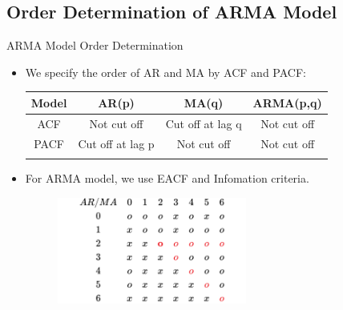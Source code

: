 \documentclass{beamer}
\begin{document}
\subsection{Order Determination of ARMA Model}
\begin{frame}{ARMA Model Order Determination}
  \begin{itemize}
    \item We specify the order of AR and MA by ACF and PACF:
      \begin{tabular}{c c c c}
        \\ %
          \toprule[2pt]
          Model & AR(p) & MA(q) & ARMA(p,q)  \\ \midrule[1pt]
          ACF   & Not cut off   & Cut off at lag q &  Not cut off\\
          PACF & Cut off at lag p & Not cut off & Not cut off\\
          \bottomrule[2pt]
          \\
      \end{tabular}
    \item For ARMA model, we use EACF and Infomation criteria.
        \begin{figure}[htp]
          \centering
          \includegraphics[height =3.5cm]{fig/eacf.png}
          \label{fig:EACF plot}  
        \end{figure}


  \end{itemize}
\end{frame}
\end{document}
